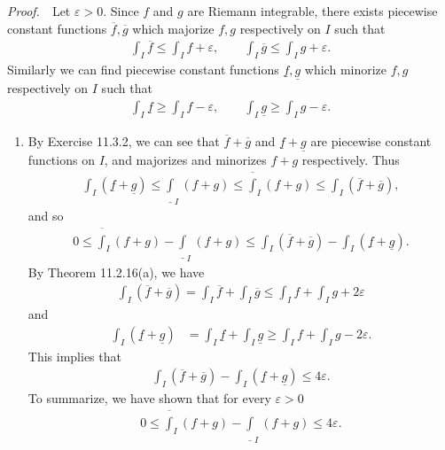 \documentclass{book}
\newcommand{\pff}{\vspace{.25em}\noindent\emph{Proof.}~~}
\newcounter{Exercise}[section]
\begin{document}
\pff Let $\varepsilon>0$. Since $f$ and $g$ are Riemann integrable, there exists piecewise constant functions $\overline f,\overline g$ which majorize $f,g$ respectively on $I$ such that
    \begin{align*}
        \int_{I}\overline f\leq\int_{I}f+\varepsilon,
        \qquad
        \int_{I}\overline g\leq\int_{I}g+\varepsilon.
    \end{align*}
Similarly we can find piecewise constant functions $\underline f,\underline g$ which minorize $f,g$ respectively on $I$ such that
    \begin{align*}
        \int_{I}\underline f\geq\int_{I}f-\varepsilon,
        \qquad
        \int_{I}\underline g\geq\int_{I}g-\varepsilon.
    \end{align*}
\begin{enumerate}
    \item By Exercise 11.3.2, we can see that $\overline f+\overline g$ and $\underline f+\underline g$ are piecewise constant functions on $I$, and majorizes and minorizes $f+g$ respectively. Thus
        \begin{align*}
            \int_{I}(\underline f+\underline g)
            \leq\underline\int_{I}(f+g)
            \leq\overline\int_{I}(f+g)
            \leq\int_{I}(\overline f+\overline g),
        \end{align*}
    and so
        \begin{align*}
            0\leq\overline\int_{I}(f+g)-\underline\int_{I}(f+g)
            \leq\int_{I}(\overline f+\overline g)-\int_{I}(\underline f+\underline g).
        \end{align*}
    By Theorem 11.2.16(a), we have
        \begin{align*}
            \int_{I}(\overline f+\overline g)=\int_{I}\overline f+\int_{I}\overline g\leq\int_{I}f+\int_{I}g+2\varepsilon
        \end{align*}
    and
        \begin{align*}
            \int_{I}(\underline f+\underline g)&=\int_{I}\underline f+\int_{I}\underline g\geq\int_{I}f+\int_{I}g-2\varepsilon.
        \end{align*}
    This implies that
        \begin{align*}
            \int_{I}(\overline f+\overline g)-\int_{I}(\underline f+\underline g)\leq 4\varepsilon.
        \end{align*}
    To summarize, we have shown that for every $\varepsilon>0$
        \begin{align*}
            0\leq\overline\int_{I}(f+g)-\underline\int_{I}(f+g)\leq 4\varepsilon.

\end{align*}
\end{enumerate}
\end{document}

